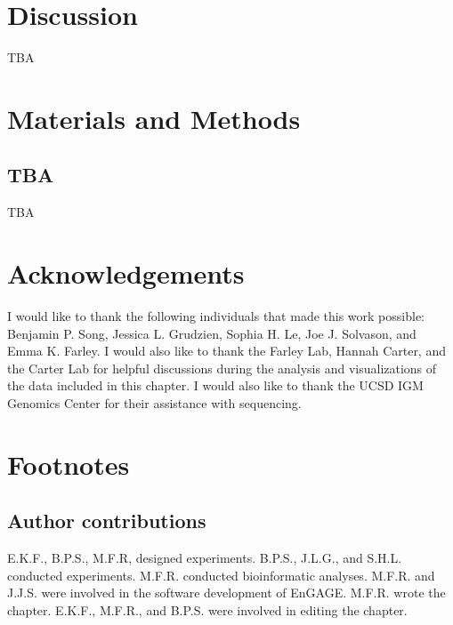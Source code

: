 \section{Discussion}

TBA

\section{Materials and Methods}

\subsection{TBA}
TBA

\section{Acknowledgements}
I would like to thank the following individuals that made this work possible: Benjamin P. Song, Jessica L. Grudzien, Sophia H. Le, Joe J. Solvason, and Emma K. Farley. I would also like to thank the Farley Lab, Hannah Carter, and the Carter Lab for helpful discussions during the analysis and visualizations of the data included in this chapter. I would also like to thank the UCSD IGM Genomics Center for their assistance with sequencing. 

\section{Footnotes}

\subsection{Author contributions}
E.K.F., B.P.S., M.F.R, designed experiments. B.P.S., J.L.G., and S.H.L. conducted experiments. M.F.R. conducted bioinformatic analyses. M.F.R. and J.J.S. were involved in the software development of EnGAGE. M.F.R. wrote the chapter. E.K.F., M.F.R., and B.P.S. were involved in editing the chapter. 

